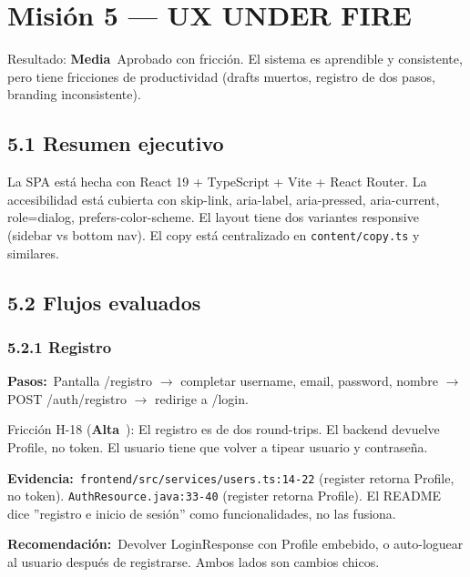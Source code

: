 \documentclass[10pt,a4paper]{article}
\newcommand{\code}[1]{\nolinkurl{#1}}
\newcommand{\badgeAlta}{\colorbox{orange!20}{\textcolor{orange!90!black}{\textbf{\footnotesize Alta}}}}
\newcommand{\badgeMedia}{\colorbox{yellow!35}{\textcolor{brown!90!black}{\textbf{\footnotesize Media}}}}
\begin{document}
\section{Misión 5 --- UX UNDER FIRE}
Resultado: \badgeMedia\  Aprobado con fricción. El sistema es aprendible y consistente, pero tiene fricciones de productividad (drafts muertos, registro de dos pasos, branding inconsistente).\par\vspace{0.4em}
\subsection{5.1 Resumen ejecutivo}
La SPA está hecha con React 19 + TypeScript + Vite + React Router. La accesibilidad está cubierta con skip-link, aria-label, aria-pressed, aria-current, role=dialog, prefers-color-scheme. El layout tiene dos variantes responsive (sidebar vs bottom nav). El copy está centralizado en \code{content/copy.ts} y similares.\par\vspace{0.4em}
\subsection{5.2 Flujos evaluados}
\subsubsection{5.2.1 Registro}
\noindent\textbf{Pasos:}\ Pantalla /registro $\rightarrow$ completar username, email, password, nombre $\rightarrow$ POST /auth/registro $\rightarrow$ redirige a /login.\par\vspace{0.4em}
Fricción H-18 (\badgeAlta\ ): El registro es de dos round-trips. El backend devuelve Profile, no token. El usuario tiene que volver a tipear usuario y contraseña.\par\vspace{0.4em}
\noindent\textbf{Evidencia:}\ \code{frontend/src/services/users.ts:14-22} (register retorna Profile, no token). \code{AuthResource.java:33-40} (register retorna Profile). El README dice ''registro e inicio de sesión'' como funcionalidades, no las fusiona.\par\vspace{0.4em}
\noindent\textbf{Recomendación:}\ Devolver LoginResponse con Profile embebido, o auto-loguear al usuario después de registrarse. Ambos lados son cambios chicos.\par\vspace{0.4em}
\end{document}
